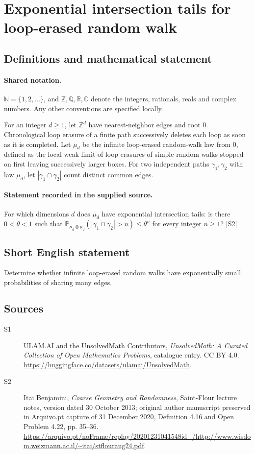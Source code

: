 \documentclass[11pt]{article}
\newcommand{\sref}[2]{\hyperlink{source:#1:#2}{[S#2]}}
\begin{document}
\section{Exponential intersection tails for loop-erased random walk}\label{statement}

\subsection{Definitions and mathematical statement}

\paragraph{Shared notation.}$\mathbb N=\{1,2,\ldots\}$, and $\mathbb Z,\mathbb Q,\mathbb R,\mathbb C$ denote the integers, rationals, reals and complex numbers. Any other conventions are specified locally.


For an integer $d\ge1$, let $\mathbb Z^d$ have nearest-neighbor edges and root $0$. Chronological loop erasure of a finite path successively deletes each loop as soon as it is completed. Let $\mu_d$ be the infinite loop-erased random-walk law from $0$, defined as the local weak limit of loop erasures of simple random walks stopped on first leaving successively larger boxes. For two independent paths $\gamma_1,\gamma_2$ with law $\mu_d$, let $|\gamma_1\cap\gamma_2|$ count distinct common edges.
\paragraph{Statement recorded in the supplied source.}
For which dimensions $d$ does $\mu_d$ have exponential intersection tails: is there $0<\theta<1$ such that $\mathbb P_{\mu_d\otimes\mu_d}(|\gamma_1\cap\gamma_2|>n)\le\theta^n$ for every integer $n\ge1$? \sref{statement}{2}
\subsection{Short English statement}
Determine whether infinite loop-erased random walks have exponentially small probabilities of sharing many edges.
\subsection{Sources}
\begin{description}
\item[\hypertarget{source:statement:1}{S1}] ULAM.AI and the UnsolvedMath Contributors, \emph{UnsolvedMath: A Curated Collection of Open Mathematics Problems}, catalogue entry. CC BY 4.0. \url{https://huggingface.co/datasets/ulamai/UnsolvedMath}.
\item[\hypertarget{source:statement:2}{S2}] Itai Benjamini, \emph{Coarse Geometry and Randomness}, Saint-Flour lecture notes, version dated 30 October 2013; original author manuscript preserved in Arquivo.pt capture of 31 December 2020, Definition 4.16 and Open Problem 4.22, pp. 35--36. \url{https://arquivo.pt/noFrame/replay/20201231041548id_/http://www.wisdom.weizmann.ac.il/~itai/stflouraug24.pdf}.
\end{description}
\label{end:statement}
\end{document}
